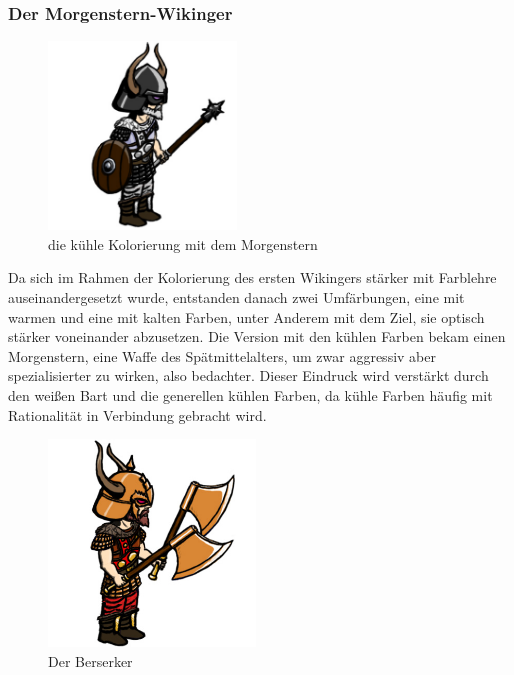 \documentclass[extern,palatino]{cgBA}
\begin{document}
\subsubsection{Der Morgenstern-Wikinger}
\begin{figure}[H]
	\centering
	\includegraphics[height=5cm]{morningstar.jpg}
	\caption{die kühle Kolorierung mit dem Morgenstern}
	\label{morningstar}
\end{figure}
Da sich im Rahmen der Kolorierung des ersten Wikingers stärker mit Farblehre auseinandergesetzt wurde, entstanden danach zwei Umfärbungen, eine mit warmen und eine mit kalten Farben, unter Anderem mit dem Ziel, sie optisch stärker voneinander abzusetzen. Die Version mit den kühlen Farben bekam einen Morgenstern, eine Waffe des Spätmittelalters, um zwar aggressiv aber spezialisierter zu wirken, also bedachter. Dieser Eindruck wird verstärkt durch den weißen Bart und die generellen kühlen Farben, da kühle Farben häufig mit Rationalität in Verbindung gebracht wird.
\newpage
\begin{figure}[H]
	\centering
	\includegraphics[height=5.5cm]{berserker.jpg}
	\caption{Der Berserker}
	\label{berserker}
\end{figure}
\end{document}
